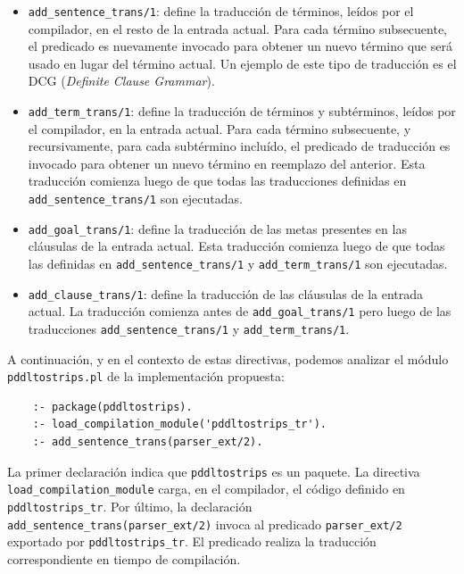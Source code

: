 	\begin{itemize}
	
	\item \texttt{add\_sentence\_trans/1}: define la traducci\'on
        de t\'erminos, le\'idos por el compilador, 
	en el resto de la entrada actual. 
        Para cada t\'ermino subsecuente, el predicado es nuevamente 
	invocado para obtener un nuevo t\'ermino que ser\'a usado en
        lugar del t\'ermino actual. Un ejemplo 
	de este tipo de traducci\'on es el DCG (\emph{Definite Clause Grammar}).
	
	\item \texttt{add\_term\_trans/1}: define la traducci\'on de
        t\'erminos y subt\'erminos, le\'idos por el compilador, 
	en la entrada actual. Para cada t\'ermino subsecuente, y
        recursivamente, para cada subt\'ermino inclu\'ido, 
	el predicado de traducci\'on es invocado para obtener un nuevo
        t\'ermino en reemplazo del anterior. 
	Esta traducci\'on comienza luego de que todas las traducciones 
        definidas en \texttt{add\_sentence\_trans/1} son ejecutadas.
	
	\item \texttt{add\_goal\_trans/1}: define la traducci\'on de 
        las metas presentes en las cl\'ausulas de la entrada actual. 
	Esta traducci\'on comienza luego de que todas las definidas 
        en \texttt{add\_sentence\_trans/1} y 
	\texttt{add\_term\_trans/1} son ejecutadas.
	
	\item \texttt{add\_clause\_trans/1}: define la traducci\'on de
        las cl\'ausulas de la entrada actual. La traducci\'on 
	comienza antes de \texttt{add\_goal\_trans/1} pero luego de
        las traducciones \texttt{add\_sentence\_trans/1} 
	y \texttt{add\_term\_trans/1}.
	
	\end{itemize}
	
	A continuaci\'on, y en el contexto de estas directivas, podemos analizar el
        m\'odulo \texttt{pddltostrips.pl} de la implementaci\'on propuesta:
	
	\begin{verbatim}
	:- package(pddltostrips). 
	:- load_compilation_module('pddltostrips_tr'). 
	:- add_sentence_trans(parser_ext/2).
	\end{verbatim}


	La primer declaraci\'on indica que \texttt{pddltostrips} es un
        paquete. La directiva 
	\texttt{load\_com\-pi\-la\-tion\_mo\-du\-le} carga, en el compilador, el 
        c\'odigo definido en \texttt{pddltostrips\_tr}. 
	Por \'ultimo, la declaraci\'on \texttt{add\_sen\-ten\-ce\_trans\-(par\-ser\_ext/2)} invoca al predicado 
	\texttt{parser\_ext/2} exportado por \texttt{pddltostrips\_tr}. 
	El predicado realiza la traducci\'on correspondiente en tiempo de compilaci\'on.
	
